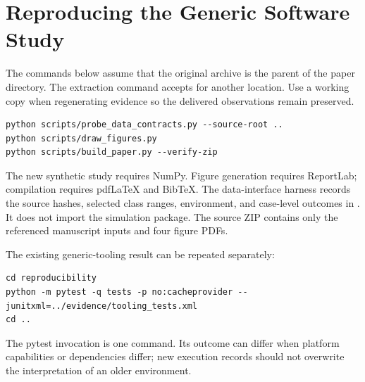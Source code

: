 \documentclass[11pt,a4paper]{article}
\begin{document}



\appendix
\section{Reproducing the Generic Software Study}
\label{app:reproduce}
The commands below assume that the original archive is the parent of the paper directory. The extraction command accepts  for another location. Use a working copy when regenerating evidence so the delivered observations remain preserved.

\begin{lstlisting}
python scripts/probe_data_contracts.py --source-root ..
python scripts/draw_figures.py
python scripts/build_paper.py --verify-zip
\end{lstlisting}
The new synthetic study requires NumPy. Figure generation requires ReportLab; compilation requires pdfLaTeX and BibTeX. The data-interface harness records the source hashes, selected class ranges, environment, and case-level outcomes in . It does not import the simulation package. The source ZIP contains only the referenced manuscript inputs and four figure PDFs.

The existing generic-tooling result can be repeated separately:
\begin{lstlisting}
cd reproducibility
python -m pytest -q tests -p no:cacheprovider --junitxml=../evidence/tooling_tests.xml
cd ..
\end{lstlisting}
The pytest invocation is one command. Its outcome can differ when platform capabilities or dependencies differ; new execution records should not overwrite the interpretation of an older environment.
\end{document}

